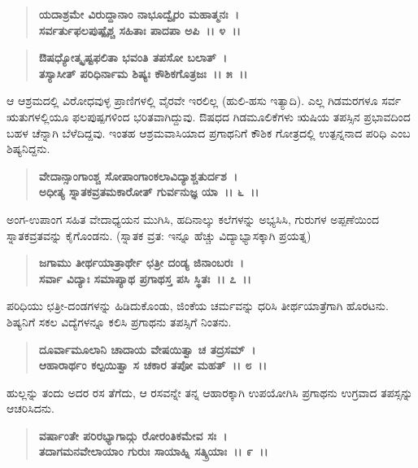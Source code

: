 \begin{verse}
\textbf{ಯದಾಶ್ರಮೇ ವಿರುದ್ದಾನಾಂ ನಾಭೂದ್ವೈರಂ ಮಹಾತ್ಮನಃ~।}\\\textbf{ಸರ್ವರ್ತುಫಲಪುಷ್ಪೈಶ್ಚ ಸಹಿತಾಃ ಪಾದಪಾ ಅಪಿ~।। ೪~।। }
\end{verse}

\begin{verse}
\textbf{ಔಷಧ್ಯೋತ್ಕೃಷ್ಟಫಲಿತಾ ಭವಂತಿ ತಪಸೋ ಬಲಾತ್~।}\\\textbf{ತಸ್ಯಾಸೀತ್ ಪರಿಧಿರ್ನಾಮ ಶಿಷ್ಯಃ ಕೌಶಿಕಗೊತ್ರಜಃ~।। ೫~।।}
\end{verse}

ಆ ಆಶ್ರಮದಲ್ಲಿ ವಿರೋಧವುಳ್ಳ ಪ್ರಾಣಿಗಳಲ್ಲಿ ವೈರವೇ ಇರಲಿಲ್ಲ (ಹುಲಿ-ಹಸು ಇತ್ಯಾದಿ). ಎಲ್ಲ ಗಿಡಮರಗಳೂ ಸರ್ವ ಋತುಗಳಲ್ಲಿಯೂ ಫಲಪುಷ್ಪಗಳಿಂದ ಭರಿತವಾಗಿದ್ದುವು. ಔಷಧದ ಗಿಡಮೂಲಿಕೆಗಳು ಋಷಿಯ ತಪಸ್ಸಿನ ಪ್ರಭಾವದಿಂದ ಬಹಳ ಚೆನ್ನಾಗಿ ಬೆಳೆದಿದ್ದವು. ಇಂತಹ ಆಶ್ರಮವಾಸಿಯಾದ ಪ್ರಗಾಥನಿಗೆ ಕೌಶಿಕ ಗೋತ್ರದಲ್ಲಿ ಉತ್ಪನ್ನನಾದ ಪರಿಧಿ ಎಂಬ ಶಿಷ್ಯನಿದ್ದನು.

\begin{verse}
\textbf{ವೇದಾನ್ಸಾಂಗಾಂಶ್ಚ ಸೋಪಾಂಗಾಂಕಲಾವಿದ್ಯಾಶ್ಚತುರ್ದಶ~।}\\\textbf{ಅಧೀತ್ಯ ಸ್ನಾತಕವ್ರತಮಕಾರೋತ್ ಗುರ್ವನುಜ್ಞ ಯಾ~।। ೬~।।}
\end{verse}

ಅಂಗ-ಉಪಾಂಗ ಸಹಿತ ವೇದಾಧ್ಯಯನ ಮುಗಿಸಿ, ಹದಿನಾಲ್ಕು ಕಲೆಗಳನ್ನು ಅಭ್ಯಸಿಸಿ, ಗುರುಗಳ ಅಪ್ಪಣೆಯಿಂದ ಸ್ನಾತಕವ್ರತವನ್ನು ಕೈಗೊಂಡನು. (ಸ್ನಾತಕ ವ್ರತ: ಇನ್ನೂ ಹೆಚ್ಚು ವಿದ್ಯಾಭ್ಯಾಸಕ್ಕಾಗಿ ಪ್ರಯತ್ನ)

\begin{verse}
\textbf{ಜಗಾಮು ತೀರ್ಥಯಾತ್ರಾರ್ಥೇ ಛತ್ರೀ ದಂಡ್ಯ ಜಿನಾಂಬರಃ~।}\\\textbf{ಸರ್ವಾ ವಿದ್ಯಾಃ ಸಮಾಪ್ಯಾಥ ಪ್ರಗಾಥಸ್ತ ಪಸಿ ಸ್ಥಿತಃ~।। ೭~।।}
\end{verse}

ಪರಿಧಿಯು ಛತ್ರೀ-ದಂಡಗಳನ್ನು ಹಿಡಿದುಕೊಂಡು, ಜಿಂಕೆಯ ಚರ್ಮವನ್ನು ಧರಿಸಿ ತೀರ್ಥಯಾತ್ರೆಗಾಗಿ ಹೊರಟನು. ಶಿಷ್ಯನಿಗೆ ಸಕಲ ವಿದ್ಯೆಗಳನ್ನೂ ಕಲಿಸಿ ಪ್ರಗಾಥನು ತಪಸ್ಸಿಗೆ ನಿಂತನು.

\begin{verse}
\textbf{ದೂರ್ವಾಮೂಲಾನಿ ಚಾದಾಯ ವೇಷಯಿತ್ವಾ ಚ ತದ್ರಸಮ್~।}\\\textbf{ಆಹಾರಾರ್ಥಂ ಕಲ್ಪಯಿತ್ವಾ ಸ ಚಕಾರ ತಪೋ ಮಹತ್~।। ೮~।।}
\end{verse}

ಹುಲ್ಲನ್ನು ತಂದು ಅದರ ರಸ ತೆಗೆದು, ಆ ರಸವನ್ನೇ ತನ್ನ ಆಹಾರಕ್ಕಾಗಿ ಉಪಯೋಗಿಸಿ ಪ್ರಗಾಥನು ಉಗ್ರವಾದ ತಪಸ್ಸನ್ನು ಆಚರಿಸಿದನು.

\begin{verse}
\textbf{ವರ್ಷಾಂತೇ ಪರಿರಭ್ಯಾಗಾದ್ಗು ರೋರಂತಿಕಮೇವ ಸಃ~।}\\\textbf{ತದಾಗಮನವೇಲಾಯಾಂ ಗುರುಃ ಸಾಯಾಹ್ನಿ ಸತ್ಕ್ರಿಯಾಃ~।। ೯~।। }
\end{verse}

